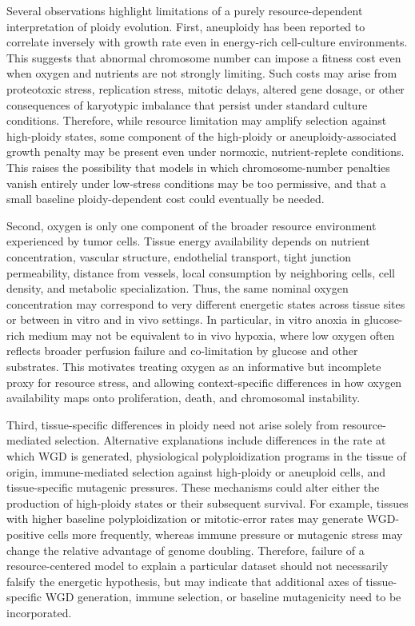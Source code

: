 \documentclass[11pt]{article}
\begin{document}
Several observations highlight limitations of a purely resource-dependent interpretation of ploidy evolution. First, aneuploidy has been reported to correlate inversely with growth rate even in energy-rich cell-culture environments. This suggests that abnormal chromosome number can impose a fitness cost even when oxygen and nutrients are not strongly limiting. Such costs may arise from proteotoxic stress, replication stress, mitotic delays, altered gene dosage, or other consequences of karyotypic imbalance that persist under standard culture conditions. Therefore, while resource limitation may amplify selection against high-ploidy states, some component of the high-ploidy or aneuploidy-associated growth penalty may be present even under normoxic, nutrient-replete conditions. This raises the possibility that models in which chromosome-number penalties vanish entirely under low-stress conditions may be too permissive, and that a small baseline ploidy-dependent cost could eventually be needed.

Second, oxygen is only one component of the broader resource environment experienced by tumor cells. Tissue energy availability depends on nutrient concentration, vascular structure, endothelial transport, tight junction permeability, distance from vessels, local consumption by neighboring cells, cell density, and metabolic specialization. Thus, the same nominal oxygen concentration may correspond to very different energetic states across tissue sites or between in vitro and in vivo settings. In particular, in vitro anoxia in glucose-rich medium may not be equivalent to in vivo hypoxia, where low oxygen often reflects broader perfusion failure and co-limitation by glucose and other substrates. This motivates treating oxygen as an informative but incomplete proxy for resource stress, and allowing context-specific differences in how oxygen availability maps onto proliferation, death, and chromosomal instability.

Third, tissue-specific differences in ploidy need not arise solely from resource-mediated selection. Alternative explanations include differences in the rate at which WGD is generated, physiological polyploidization programs in the tissue of origin, immune-mediated selection against high-ploidy or aneuploid cells, and tissue-specific mutagenic pressures. These mechanisms could alter either the production of high-ploidy states or their subsequent survival. For example, tissues with higher baseline polyploidization or mitotic-error rates may generate WGD-positive cells more frequently, whereas immune pressure or mutagenic stress may change the relative advantage of genome doubling. Therefore, failure of a resource-centered model to explain a particular dataset should not necessarily falsify the energetic hypothesis, but may indicate that additional axes of tissue-specific WGD generation, immune selection, or baseline mutagenicity need to be incorporated.
\end{document}
